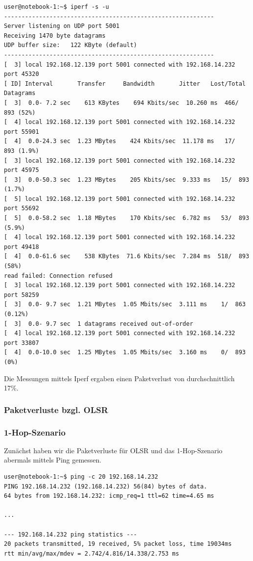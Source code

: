 \documentclass[a4paper,10pt]{article}
\begin{document}
\begin{lstlisting}
user@notebook-1:~$ iperf -s -u
------------------------------------------------------------
Server listening on UDP port 5001
Receiving 1470 byte datagrams
UDP buffer size:   122 KByte (default)
------------------------------------------------------------
[  3] local 192.168.12.139 port 5001 connected with 192.168.14.232 port 45320
[ ID] Interval       Transfer     Bandwidth       Jitter   Lost/Total Datagrams
[  3]  0.0- 7.2 sec    613 KBytes    694 Kbits/sec  10.260 ms  466/  893 (52%)
[  4] local 192.168.12.139 port 5001 connected with 192.168.14.232 port 55901
[  4]  0.0-24.3 sec  1.23 MBytes    424 Kbits/sec  11.178 ms   17/  893 (1.9%)
[  3] local 192.168.12.139 port 5001 connected with 192.168.14.232 port 45975
[  3]  0.0-50.3 sec  1.23 MBytes    205 Kbits/sec  9.333 ms   15/  893 (1.7%)
[  5] local 192.168.12.139 port 5001 connected with 192.168.14.232 port 55692
[  5]  0.0-58.2 sec  1.18 MBytes    170 Kbits/sec  6.782 ms   53/  893 (5.9%)
[  4] local 192.168.12.139 port 5001 connected with 192.168.14.232 port 49418
[  4]  0.0-61.6 sec    538 KBytes  71.6 Kbits/sec  7.284 ms  518/  893 (58%)
read failed: Connection refused
[  3] local 192.168.12.139 port 5001 connected with 192.168.14.232 port 58259
[  3]  0.0- 9.7 sec  1.21 MBytes  1.05 Mbits/sec  3.111 ms    1/  863 (0.12%)
[  3]  0.0- 9.7 sec  1 datagrams received out-of-order
[  4] local 192.168.12.139 port 5001 connected with 192.168.14.232 port 33807
[  4]  0.0-10.0 sec  1.25 MBytes  1.05 Mbits/sec  3.160 ms    0/  893 (0%)
\end{lstlisting}

Die Messungen mittels Iperf ergaben einen Paketverlust von durchschnittlich 17\%.

\subsubsection{Paketverluste bzgl. OLSR}

\subsubsection*{1-Hop-Szenario}

Zunächst haben wir die Paketverluste für OLSR und das 1-Hop-Szenario abermals mittels Ping gemessen.

\begin{lstlisting}
user@notebook-1:~$ ping -c 20 192.168.14.232
PING 192.168.14.232 (192.168.14.232) 56(84) bytes of data.
64 bytes from 192.168.14.232: icmp_req=1 ttl=62 time=4.65 ms

...

--- 192.168.14.232 ping statistics ---
20 packets transmitted, 19 received, 5% packet loss, time 19034ms
rtt min/avg/max/mdev = 2.742/4.816/14.338/2.753 ms
\end{lstlisting}
\end{document}
